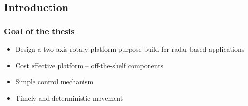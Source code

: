 \documentclass[aspectratio=43]{beamer}
\title{\ThesisTitle}
\subtitle{\Department}
\author{Havránek Kryštof }
\date{5th December 2024}
\institute{ČVUT-FEL}
\begin{document}
\begin{frame}[plain]
	\maketitle
\end{frame}

\clearpage
\setcounter{framenumber}{0}



\begin{frame}[fragile]
\section{Introduction}
  \frametitle{Goal of the thesis}
  \begin{itemize}
    \item Design a two-axis rotary platform purpose build for radar-based applications
    \item Cost effective platform -- off-the-shelf components
    \item Simple control mechanism
    \item Timely and deterministic movement
  \end{itemize}
\end{frame}
\end{document}
